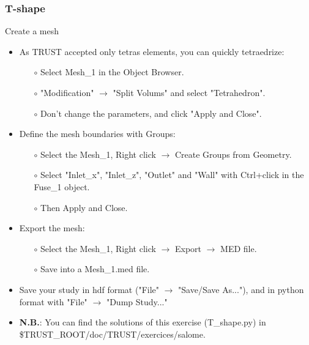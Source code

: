 \documentclass[10pt]{beamer}
\begin{document}
\begin{frame}
\frametitle{T-shape}
\begin{block}{Create a mesh}

\begin{itemize}
\item As TRUST accepted only tetras elements, you can quickly tetraedrize:
    \begin{itemize}
    \item [$\circ$] Select Mesh\_1 in the Object Browser.
    \item [$\circ$] "Modification" $\rightarrow$ "Split Volums" and select "Tetrahedron".
    \item [$\circ$] Don't change the parameters, and click "Apply and Close".
    \end{itemize}

\item Define the mesh boundaries with Groups:
    \begin{itemize}
    \item [$\circ$] Select the Mesh\_1, Right click $\rightarrow$ Create Groups from Geometry.
    \item [$\circ$] Select "Inlet\_x", "Inlet\_z", "Outlet" and "Wall" with Ctrl+click in the Fuse\_1 object.
    \item [$\circ$] Then Apply and Close.
    \end{itemize}

\item Export the mesh:
    \begin{itemize}
    \item [$\circ$] Select the Mesh\_1, Right click $\rightarrow$ Export $\rightarrow$ MED file.
    \item [$\circ$] Save into a Mesh\_1.med file.
    \end{itemize}

\item Save your study in hdf format ("File" $\rightarrow$ "Save/Save As..."), and in python format with "File" $\rightarrow$ "Dump Study..."

\item \textbf{N.B.}: You can find the solutions of this exercise (T\_shape.py) in \$TRUST\_ROOT/doc/TRUST/exercices/salome.
\end{itemize}

\end{block}
\end{frame}
\end{document}
